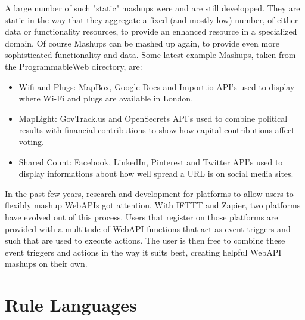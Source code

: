 A large number of such "static" mashups were and are still developped.
They are static in the way that they aggregate a fixed (and mostly low) number, of either data or functionality resources, to provide an enhanced resource in a specialized domain.
Of course Mashups can be mashed up again, to provide even more sophisticated functionality and data.
Some latest example Mashups, taken from the ProgrammableWeb\cite{wwwProgrammableWeb} directory, are:

\begin{itemize}
  \item Wifi and Plugs\cite{wwwWifiAndPlugs}: MapBox, Google Docs and Import.io API's used to display where Wi-Fi and plugs are available in London.
  \item MapLight\cite{wwwMapLight}: GovTrack.us and OpenSecrets API's used to combine political results with financial contributions to show how capital contributions affect voting.
  \item Shared Count\cite{wwwSharedCount}: Facebook, LinkedIn, Pinterest and Twitter API's used to display informations about how well spread a URL is on social media sites.
\end{itemize}

In the past few years, research and development for platforms to allow users to flexibly mashup WebAPIs got attention.
With IFTTT and Zapier, two platforms have evolved out of this process.
Users that register on those platforms are provided with a multitude of WebAPI functions that act as event triggers and such that are used to execute actions.
The user is then free to combine these event triggers and actions in the way it suits best, creating helpful WebAPI mashups on their own.






\section{Rule Languages}





